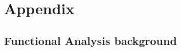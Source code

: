 \documentclass{article}
\begin{document}
\section{Appendix}
\subsection{Functional Analysis background}


%
%
\end{document}
